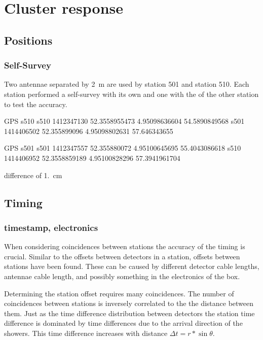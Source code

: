 \chapter{Cluster response}


\section{Positions}

\subsection{\gps Self-Survey}

Two \gps antennae separated by \SI{2}{\meter} are used by station 501
and station 510. Each station performed a self-survey with its own \gps
and one with the \gps of the other station to test the accuracy.
 
GPS s510
s510  1412347130	52.3558955473	4.95098636604	54.5890849568
s501  1414406502	52.355899096	4.95098802631	57.646343655

GPS s501
s501  1412347557	52.355880072	4.95100645695	55.4043086618
s510  1414406952	52.3558859189	4.95100828296	57.3941961704

difference of \SI{1.}{\centi\meter}


\section{Timing}

\subsection{\gps timestamp, electronics}

When considering coincidences between stations the accuracy of the
timing is crucial. Similar to the offsets between detectors in a
station, offsets between stations have been found. These can be caused
by different detector cable lengths, \gps antennae cable length, and
possibly something in the electronics of the \hisparc box.

Determining the station offset requires many coincidences. The number of
coincidences between stations is inversely correlated to the the
distance between them. Just as the time difference distribution between
detectors the station time difference is dominated by time differences
due to the arrival direction of the showers. This time difference
increases with distance $\Delta t = r * \sin{\theta}$.

